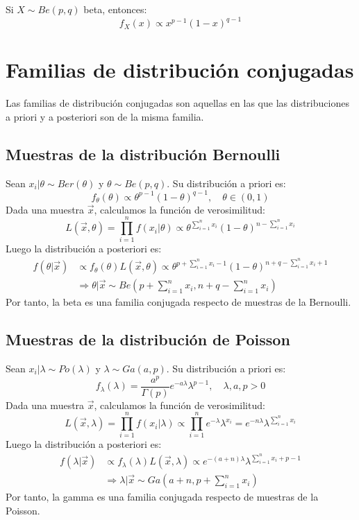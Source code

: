 \begin{note}
    Si $X \sim Be(p, q)$ beta, entonces:
    $$f_X(x) \propto x^{p-1}(1-x)^{q-1}$$
\end{note}

\section{Familias de distribución conjugadas}
Las familias de distribución conjugadas son aquellas en las que las distribuciones a priori y a posteriori son de la misma familia.

\subsection*{Muestras de la distribución Bernoulli}
Sean $x_i|\theta \sim Ber(\theta)$ y $\theta \sim Be(p, q)$.
Su distribución a priori es:
$$f_\theta(\theta) \propto \theta^{p-1}(1-\theta)^{q-1}, \quad \theta \in (0, 1)$$
Dada una muestra $\vec{x}$, calculamos la función de verosimilitud:
$$L(\vec{x}, \theta) = \prod_{i=1}^n f(x_i|\theta) \propto \theta^{\sum_{i=1}^n x_i}(1-\theta)^{n-\sum_{i=1}^n x_i}$$
Luego la distribución a posteriori es:
\begin{align*}
    f(\theta|\vec{x}) & \propto f_\theta(\theta)L(\vec{x}, \theta) \propto \theta^{p+\sum_{i=1}^n x_i-1}(1-\theta)^{n+q-\sum_{i=1}^n x_i+1} \\
                      & \Rightarrow \theta|\vec{x} \sim Be\left(p+\sum_{i=1}^n x_i, n+q-\sum_{i=1}^n x_i\right)
\end{align*}
Por tanto, la beta es una familia conjugada respecto de muestras de la Bernoulli.

\subsection*{Muestras de la distribución de Poisson}
Sean $x_i|\lambda \sim Po(\lambda)$ y $\lambda \sim Ga(a, p)$.
Su distribución a priori es:
$$f_\lambda(\lambda) = \frac{a^p}{\Gamma(p)}e^{-a\lambda}\lambda^{p-1}, \quad \lambda, a, p > 0$$
Dada una muestra $\vec{x}$, calculamos la función de verosimilitud:
$$L(\vec{x}, \lambda) = \prod_{i=1}^n f(x_i|\lambda) \propto \prod_{i=1}^n e^{-\lambda}\lambda^{x_i} = e^{-n\lambda}\lambda^{\sum_{i=1}^n x_i}$$
Luego la distribución a posteriori es:
\begin{align*}
    f(\lambda|\vec{x}) & \propto f_\lambda(\lambda)L(\vec{x}, \lambda) \propto e^{-(a+n)\lambda}\lambda^{\sum_{i=1}^n x_i+p-1} \\
                       & \Rightarrow \lambda|\vec{x} \sim Ga(a+n, p+\sum_{i=1}^n x_i)
\end{align*}
Por tanto, la gamma es una familia conjugada respecto de muestras de la Poisson.

